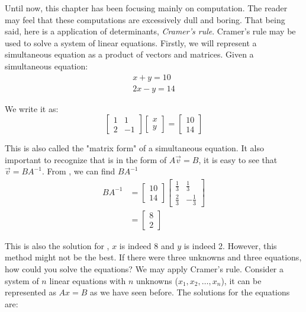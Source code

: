 Until now, this chapter has been focusing mainly on computation. The reader may feel that these computations are excessively dull and boring. That being said, here is a application of determinants, \emph{Cramer's rule}. Cramer's rule may be used to solve a system of linear equations. Firstly, we will represent a simultaneous equation as a product of vectors and matrices. Given a simultaneous equation:
\begin{equation}
  \begin{array}{l}
    x + y = 10 \\
    2x - y = 14
  \end{array}
\end{equation}


We write it as:
\begin{equation}
  \begin{bmatrix}
    1 & 1 \\
    2 & -1
  \end{bmatrix} \begin{bmatrix}
    x \\
    y
  \end{bmatrix} = \begin{bmatrix}
    10 \\
    14
  \end{bmatrix}
  \label{simulmatrix}
\end{equation}


This is also called the "matrix form" of a simultaneous equation. It also important to recognize that  is in the form of \(A\vec{v}=B\), it is easy to see that \(\vec{v}=BA^{-1}\). From , we can find \(BA^{-1}\)
\begin{align*}
  BA^{-1} &= \begin{bmatrix}
    10 \\
    14
  \end{bmatrix} \begin{bmatrix}
    \frac{1}{3} & \frac{1}{3} \\
    \frac{2}{3} & -\frac{1}{3}
  \end{bmatrix} \\
  &= \begin{bmatrix}
    8 \\
    2
  \end{bmatrix}
\end{align*}


This is also the solution for , \(x\) is indeed 8 and \(y\) is indeed 2. However, this method might not be the best. If there were three unknowns and three equations, how could you solve the equations? We may apply Cramer's rule. Consider a system of \(n\) linear equations with \(n\) unknowns (\(x_1, x_2, \dots, x_n \)), it can be represented as \(Ax=B\) as we have seen before. The solutions for the equations are:

